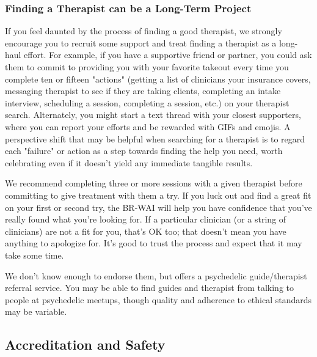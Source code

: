\documentclass[12pt,letterpaper]{book}
\begin{document}
\subsubsection*{Finding a Therapist can be a Long-Term Project}
If you feel daunted by the process of finding a good therapist, we strongly encourage you to recruit some support and treat finding a therapist as a long-haul effort. For example, if you have a supportive friend or partner, you could ask them to commit to providing you with your favorite takeout every time you complete ten or fifteen "actions" (getting a list of clinicians your insurance covers, messaging therapist to see if they are taking clients, completing an intake interview, scheduling a session, completing a session, etc.) on your therapist search. Alternately, you might start a text thread with your closest supporters, where you can report your efforts and be rewarded with GIFs and emojis. A perspective shift that may be helpful when searching for a therapist is to regard each "failure" or action as a step towards finding the help you need, worth celebrating even if it doesn't yield any immediate tangible results.

We recommend completing three or more sessions with a given therapist before committing to give treatment with them a try. If you luck out and find a great fit on your first or second try, the BR-WAI will help you have confidence that you've really found what you're looking for. If a particular clinician (or a string of clinicians) are not a fit for you, that's OK too; that doesn't mean you have anything to apologize for. It's good to trust the process and expect that it may take some time.

We don't know enough to endorse them, but \textcite{psychedelicPassage} offers a psychedelic guide/therapist referral service. You may be able to find guides and therapist from talking to people at psychedelic meetups, though quality and adherence to ethical standards may be variable.

\subsection*{Accreditation and Safety}
\label{sec:accreditation}
\end{document}
